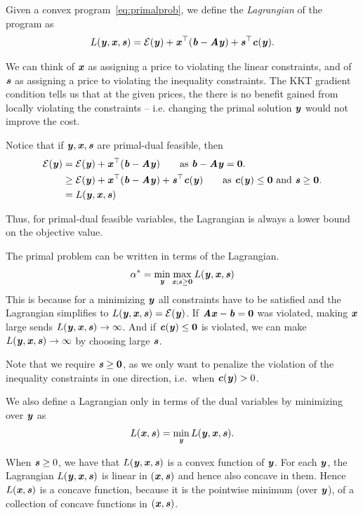 \begin{definition}
Given a convex program~\eqref{eq:primalprob}, we define the
\emph{Lagrangian} of the program as
\begin{equation*} L(\yy, \xx, \ss) = \energy(\yy) +
  \xx^{\trp}(\bb-\AA\yy) + \ss^{\trp}\cc(\yy). \end{equation*}


We can think of $\xx$ as assigning a price to violating the linear
constraints, and of $\ss$ as assigning a price to violating the
inequality constraints.
The KKT gradient condition tells us that at the given prices, the
there is no benefit gained from locally violating the constraints --
i.e. changing the primal solution $\yy$ would not improve the cost.

Notice that if $\yy,\xx,\ss$ are primal-dual feasible, then
\begin{align}
  \energy(\yy)
  &= \energy(\yy) + \xx^{\trp}(\bb-\AA\yy)  \tag*{as
  $\bb-\AA\yy = \veczero$.}\\
    &\geq \energy(\yy) + \xx^{\trp}(\bb-\AA\yy) + \ss^{\top} \cc(\yy)  \tag*{as
      $\cc(\yy) \leq \veczero$ and $\ss \geq \veczero$.}\\
  &= L(\yy,\xx,\ss) \label{eq:weakdual}
\end{align}

Thus, for primal-dual feasible variables, the Lagrangian is always a
lower bound on the objective value.


The primal problem can be written in terms of the Lagrangian.
\begin{equation}
  \label{eq:primalminmax}
  \alpha^* = \min_{\yy}\max_{\xx; \ss\geq\veczero} L(\yy, \xx, \ss)
\end{equation}
This is because for a minimizing $\yy$ all constraints have to be satisfied and the Lagrangian simplifies to $L(\yy,\xx,\ss) = \energy(\yy)$.
If $\AA\xx - \bb = \veczero$ was violated, making $\xx$ large sends $L(\yy,\xx,\ss) \rightarrow \infty$.
And if $\cc(\yy) \leq \veczero$ is violated, we can make $L(\yy,\xx,\ss) \rightarrow \infty$ by choosing large $\ss$.

Note that we require $\ss \geq \veczero$, as we only want to penalize the violation of the inequality constraints in one direction, i.e.\ when $\cc(\yy) > 0$.


We also define a Lagrangian only in terms of the dual variables by minimizing over $\yy$ as
\begin{equation*} L(\xx, \ss) = \min_{\yy}L(\yy, \xx,
  \ss). \end{equation*}

\end{definition}
When $\ss \geq 0$, we have that $L(\yy,\xx,\ss)$ is a
convex function of $\yy$.
For each $\yy$, the Lagrangian $L(\yy, \xx,
\ss)$ is linear in $(\xx,\ss)$ and hence also concave in them.
Hence $L(\xx,  \ss)$ is a concave function, because it is the pointwise
minimum (over $\yy$), of a collection of concave functions in
$(\xx,\ss)$.


